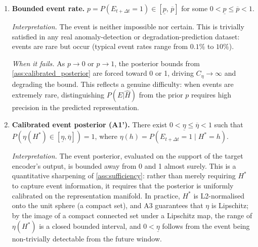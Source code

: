 \begin{enumerate}[label=\textbf{(A\arabic*)}]
  \emph{Interpretation.} Small perturbations of the target representation do not drastically change the event probability. This is a regularity condition on the relationship between the learned representation space and event occurrence; it holds whenever the event boundary in representation space is not a fractal or highly irregular set.

  \emph{When it fails.} If the event probability is a discontinuous function of $H^*$ (e.g.\ a hard threshold on a single component), the Lipschitz constant $L$ diverges and our continuity argument requires replacement by a discrete analysis.

  \item \label{ass:event_rate} \textbf{Bounded event rate.}
  $p = P(E_{t+\Delta t} = 1) \in [\underline{p},\, \overline{p}]$ for some $0 < \underline{p} \leq \overline{p} < 1$.

  \emph{Interpretation.} The event is neither impossible nor certain. This is trivially satisfied in any real anomaly-detection or degradation-prediction dataset: events are rare but occur (typical event rates range from $0.1\%$ to $10\%$).

  \emph{When it fails.} As $p \to 0$ or $p \to 1$, the posterior bounds from \ref{ass:calibrated_posterior} are forced toward 0 or 1, driving $C_\eta \to \infty$ and degrading the bound. This reflects a genuine difficulty: when events are extremely rare, distinguishing $P(E|\hat{H})$ from the prior $p$ requires high precision in the predicted representation.

  \item \label{ass:calibrated_posterior} \textbf{Calibrated event posterior (A1').}
  There exist $0 < \underline{\eta} \leq \overline{\eta} < 1$ such that $P(\eta(H^*) \in [\underline{\eta},\overline{\eta}]) = 1$, where $\eta(h) = P(E_{t+\Delta t}=1 \mid H^*=h)$.

  \emph{Interpretation.} The event posterior, evaluated on the support of the target encoder's output, is bounded away from 0 and 1 almost surely. This is a quantitative sharpening of \ref{ass:sufficiency}: rather than merely requiring $H^*$ to capture event information, it requires that the posterior is uniformly calibrated on the representation manifold. In practice, $H^*$ is L2-normalised onto the unit sphere (a compact set), and A3 guarantees that $\eta$ is Lipschitz; by the image of a compact connected set under a Lipschitz map, the range of $\eta(H^*)$ is a closed bounded interval, and $0 < \underline{\eta}$ follows from the event being non-trivially detectable from the future window.


\end{enumerate}
